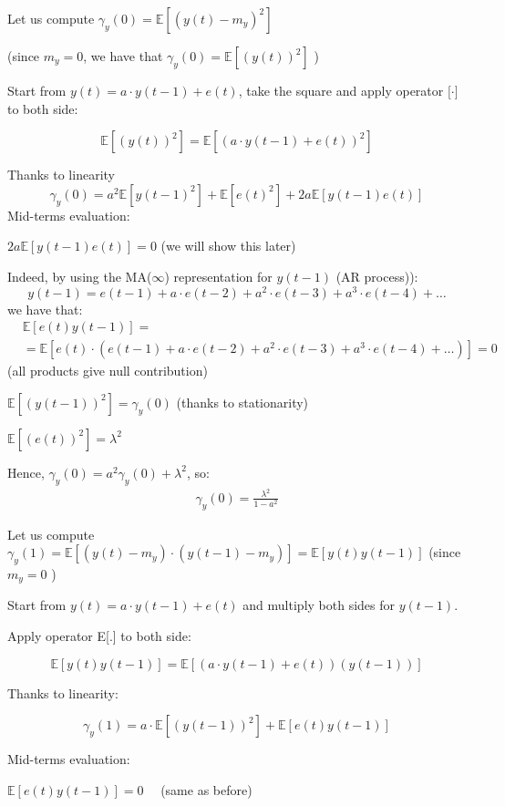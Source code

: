 Let us compute $\gamma_{y}(0)=\mathbb{E}\left[\left(y(t)-m_{y}\right)^{2}\right]$

(since $m_{y}=0$, we have that $\gamma_{y}(0)=\mathbb{E}\left[(y(t))^{2}\right]$ )

Start from $y(t)=a \cdot y(t-1)+e(t)$, take the square and apply operator $\mathbb[\cdot]$ to both side:

$$
\mathbb{E}\left[(y(t))^{2}\right]=\mathbb{E}\left[(a \cdot y(t-1)+e(t))^{2}\right]
$$

Thanks to linearity
$$
\gamma_{y}(0)=a^{2} \mathbb{E}\left[y(t-1)^{2}\right]+\mathbb{E}\left[e(t)^{2}\right]+2 a \mathbb{E}[y(t-1) e(t)]
$$
Mid-terms evaluation:

$2 a \mathbb{E}[y(t-1) e(t)]=0$ (we will show this later)

Indeed, by using the MA($\infty$) representation for $y(t-1)$ (AR process)):
$$
y(t-1)=e(t-1)+a \cdot e(t-2)+a^{2} \cdot e(t-3)+a^{3} \cdot e(t-4)+\ldots
$$
we have that:
\begin{align*}
	&\mathbb{E}[e(t) y(t-1)]= \\
	&=\mathbb{E}\left[e(t) \cdot\left(e(t-1)+a \cdot e(t-2)+a^{2} \cdot e(t-3)+a^{3} \cdot e(t-4)+\ldots\right)\right]=0
\end{align*}
(all products give null contribution)


$\mathbb{E}\left[(y(t-1))^{2}\right]=\gamma_{y}(0)$ (thanks to stationarity)

$\mathbb{E}\left[(e(t))^{2}\right]=\lambda^{2}$

Hence, $\gamma_{y}(0)=a^{2} \gamma_{y}(0)+\lambda^{2}$, so:
\begin{align*}
	\gamma_{y}(0)=\frac{\lambda^{2}}{1-a^{2}}
\end{align*} 

Let us compute $\gamma_{y}(1)=\mathbb{E}\left[\left(y(t)-m_{y}\right) \cdot\left(y(t-1)-m_{y}\right)\right]=\mathbb{E}[y(t) y(t-1)]$ (since $m_{y}=0$ )

Start from $y(t)=a \cdot y(t-1)+e(t)$ and multiply both sides for $y(t-1)$.

Apply operator E[.] to both side:

$$\mathbb{E}[y(t) y(t-1)]=\mathbb{E}[(a \cdot y(t-1)+e(t))(y(t-1))]$$

Thanks to linearity:

$$\gamma_{y}(1)=a \cdot \mathbb{E}\left[(y(t-1))^{2}\right]+\mathbb{E}[e(t) y(t-1)]$$

Mid-terms evaluation:

$\mathbb{E}[e(t) y(t-1)]=0 \quad$ (same as before)

